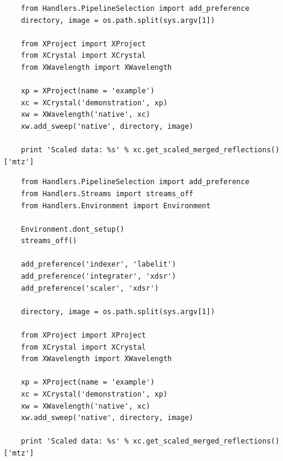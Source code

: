 \documentclass[slides,compress]{beamer}
\begin{document}
\begin{frame}[fragile]
\tiny{
\begin{verbatim}
    from Handlers.PipelineSelection import add_preference
    directory, image = os.path.split(sys.argv[1])

    from XProject import XProject
    from XCrystal import XCrystal
    from XWavelength import XWavelength
   
    xp = XProject(name = 'example')
    xc = XCrystal('demonstration', xp)
    xw = XWavelength('native', xc)
    xw.add_sweep('native', directory, image)
   
    print 'Scaled data: %s' % xc.get_scaled_merged_reflections()['mtz']
\end{verbatim}
}
\end{frame}


\begin{frame}[fragile]
\tiny{
\begin{verbatim}
    from Handlers.PipelineSelection import add_preference
    from Handlers.Streams import streams_off
    from Handlers.Environment import Environment

    Environment.dont_setup()
    streams_off()

    add_preference('indexer', 'labelit')
    add_preference('integrater', 'xdsr')
    add_preference('scaler', 'xdsr')

    directory, image = os.path.split(sys.argv[1])

    from XProject import XProject
    from XCrystal import XCrystal
    from XWavelength import XWavelength
   
    xp = XProject(name = 'example')
    xc = XCrystal('demonstration', xp)
    xw = XWavelength('native', xc)
    xw.add_sweep('native', directory, image)
   
    print 'Scaled data: %s' % xc.get_scaled_merged_reflections()['mtz']
\end{verbatim}
}
\end{frame}
\end{document}
